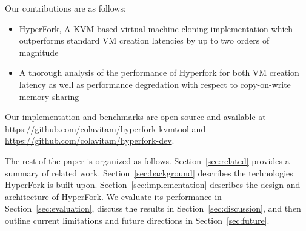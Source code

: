  Our contributions are as follows:
\begin{itemize}
\item HyperFork, A KVM-based virtual machine cloning implementation which
outperforms standard VM creation latencies by up to two orders of magnitude
\item A thorough analysis of the performance of Hyperfork for both VM creation
latency as well as performance degredation with respect to copy-on-write memory
sharing
\end{itemize}

Our implementation and benchmarks are open source and available at
\url{https://github.com/colavitam/hyperfork-kvmtool} and
\url{https://github.com/colavitam/hyperfork-dev}.

The rest of the paper is organized as follows. Section~\ref{sec:related} provides a summary of related work. Section~\ref{sec:background} describes the technologies HyperFork is built upon. Section~\ref{sec:implementation} describes the design and architecture of HyperFork. We evaluate its performance in Section~\ref{sec:evaluation}, discuss the results in Section~\ref{sec:discussion}, and then outline current limitations and future directions in Section~\ref{sec:future}.
